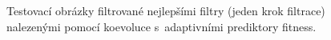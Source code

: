 \documentclass[czech]{ExcelAtFIT} %
\begin{document}
\begin{figure}[b!]
{    }\hfill
    \hfill
    \caption{Testovací obrázky filtrované nejlepšími filtry (jeden krok filtrace) nalezenými pomocí koevoluce s~adaptivními prediktory fitness.}
    \label{fig:BestImages}
\end{figure}
\end{document}
